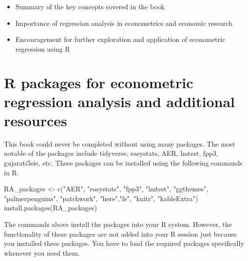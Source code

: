 \documentclass[
  letterpaper,
  paper =a4,
  twoside,
  openright,
  headsepline,
  footsepline,
  listof = totocnumbered,
  chapterprefix = true,
  firstiscover,
  parskip = full*]{scrbook}
\newenvironment{Shaded}{\begin{snugshade}}{\end{snugshade}}
\newcommand{\FunctionTok}[1]{\textcolor[rgb]{0.28,0.35,0.67}{#1}}
\newcommand{\NormalTok}[1]{\textcolor[rgb]{0.00,0.23,0.31}{#1}}
\newcommand{\OtherTok}[1]{\textcolor[rgb]{0.00,0.23,0.31}{#1}}
\newcommand{\StringTok}[1]{\textcolor[rgb]{0.13,0.47,0.30}{#1}}
\begin{document}
\begin{itemize}
\item
  Summary of the key concepts covered in the book
\item
  Importance of regression analysis in econometrics and economic
  research
\item
  Encouragement for further exploration and application of econometric
  regression using R
\end{itemize}

\cleardoublepage
{}
{}
\appendix

\chapter{R packages for econometric regression analysis and additional
resources}\label{sec-packages}

\setcounter{figure}{0} 
\renewcommand{\thefigure}{A.\arabic{figure}}
\setcounter{table}{0} 
\renewcommand{\thetable}{A.\arabic{table}}

This book could never be completed without using many packages. The most
notable of the packages include tidyverse, easystats, AER, lmtest, fpp3,
gujarati5sie, etc. These packages can be installed using the following
commands in R.

\begin{Shaded}
\begin{Highlighting}[]
\NormalTok{RA\_packages }\OtherTok{\textless{}{-}} \FunctionTok{c}\NormalTok{(}\StringTok{"AER"}\NormalTok{,}
                 \StringTok{"easystats"}\NormalTok{,}
                 \StringTok{"fpp3"}\NormalTok{,}
                 \StringTok{"lmtest"}\NormalTok{,}
                 \StringTok{"ggthemes"}\NormalTok{,}
                 \StringTok{"palmerpenguins"}\NormalTok{,}
                 \StringTok{"patchwork"}\NormalTok{,}
                 \StringTok{"here"}\NormalTok{,}\StringTok{"fs"}\NormalTok{,}
                 \StringTok{"knitr"}\NormalTok{,}
                 \StringTok{"kableExtra"}\NormalTok{)}
\FunctionTok{install.packages}\NormalTok{(RA\_packages)}
\end{Highlighting}
\end{Shaded}

The commands above install the packages into your R system. However, the
functionality of these packages are not added into your R session just
because you installed these packages. You have to load the required
packages specifically whenever you need them.
\end{document}
